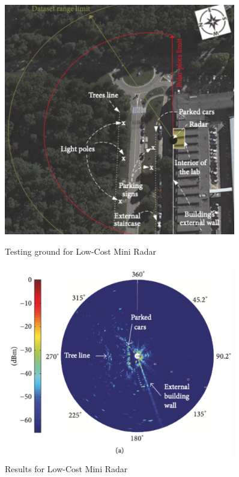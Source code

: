 \begin{figure}
    \centering
    \begin{minipage}{0.45\textwidth}
        \centering
        \includegraphics[width=0.9\textwidth]{images/tests.pdf}
        \caption{Testing ground for Low-Cost Mini Radar \cite{tarchi_low-cost_2017}}\label{fig:LCtesting}
    \end{minipage}\hfill
    \begin{minipage}{0.45\textwidth}
        \centering
        \includegraphics[width=0.9\textwidth]{images/lowcostradar.pdf}
        \caption{Results for Low-Cost Mini Radar \cite{tarchi_low-cost_2017}}\label{fig:LCresults}
    \end{minipage}
\end{figure}

